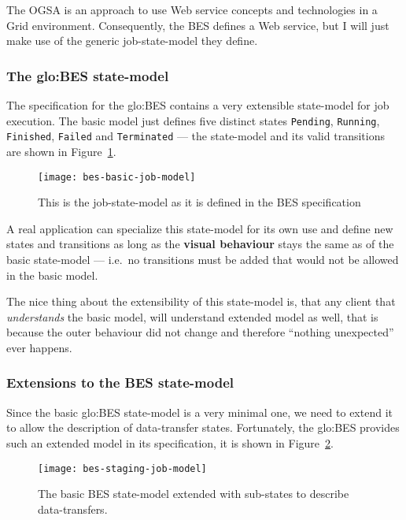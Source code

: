 The OGSA is an approach to  use Web service concepts and technologies in a
Grid  environment. Consequently, the BES defines a Web service, but I will
just make use of the generic job-state-model they define.

\subsubsection{The \gls{glo:BES} state-model}

The  specification  for  the  \gls{glo:BES}  contains  a  very  extensible
state-model for job execution.  The basic model just defines five distinct
states      \texttt{Pending},     \texttt{Running},     \texttt{Finished},
\texttt{Failed} and \texttt{Terminated} ---  the state-model and its valid
transitions are shown in Figure~\ref{fig:bes-basic}.

\begin{figure}
  \begin{center}
    \texttt{[image: bes-basic-job-model]}
  \end{center}
  \caption[Basic BES Job-State-Model]{This is the job-state-model as it is
    defined in the BES specification \cite{ogsa-bes}}
  \label{fig:bes-basic}
\end{figure}

A real  application can  specialize this state-model  for its own  use and
define new states and transitions as long as the \textbf{visual behaviour}
stays the same as of the basic state-model --- i.e.~no transitions must be
added that would not be allowed in the basic model.

The nice  thing about the extensibility  of this state-model  is, that any
client that  \emph{understands} the basic model,  will understand extended
model as  well, that  is because  the outer behaviour  did not  change and
therefore ``nothing unexpected'' ever happens.

\subsubsection{Extensions to the BES state-model}

Since the basic  \gls{glo:BES} state-model is a very  minimal one, we need
to  extend   it  to  allow   the  description  of   data-transfer  states.
Fortunately,  the \gls{glo:BES}  provides such  an extended  model  in its
specification, it is shown in Figure~\ref{fig:bes-extended}.

\begin{figure}
  \begin{center}
    \texttt{[image: bes-staging-job-model]}
  \end{center}
  \caption[BES State Model Staging Extension]{The basic BES state-model
    extended with sub-states to describe data-transfers.}
  \label{fig:bes-extended}
\end{figure}

